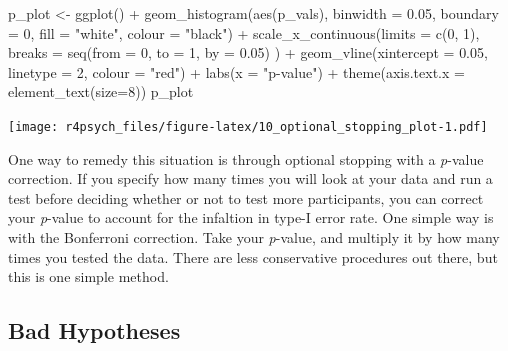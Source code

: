 \documentclass[
]{book}
\newenvironment{Shaded}{\begin{snugshade}}{\end{snugshade}}
\newcommand{\AttributeTok}[1]{\textcolor[rgb]{0.77,0.63,0.00}{#1}}
\newcommand{\DecValTok}[1]{\textcolor[rgb]{0.00,0.00,0.81}{#1}}
\newcommand{\FloatTok}[1]{\textcolor[rgb]{0.00,0.00,0.81}{#1}}
\newcommand{\FunctionTok}[1]{\textcolor[rgb]{0.00,0.00,0.00}{#1}}
\newcommand{\NormalTok}[1]{#1}
\newcommand{\OtherTok}[1]{\textcolor[rgb]{0.56,0.35,0.01}{#1}}
\newcommand{\SpecialCharTok}[1]{\textcolor[rgb]{0.00,0.00,0.00}{#1}}
\newcommand{\StringTok}[1]{\textcolor[rgb]{0.31,0.60,0.02}{#1}}
\begin{document}
\begin{Shaded}
\begin{Highlighting}[]
\NormalTok{p\_plot }\OtherTok{\textless{}{-}} \FunctionTok{ggplot}\NormalTok{() }\SpecialCharTok{+} 
  \FunctionTok{geom\_histogram}\NormalTok{(}\FunctionTok{aes}\NormalTok{(p\_vals),}
                 \AttributeTok{binwidth =} \FloatTok{0.05}\NormalTok{,}
                 \AttributeTok{boundary =} \DecValTok{0}\NormalTok{,}
                 \AttributeTok{fill =} \StringTok{"white"}\NormalTok{,}
                 \AttributeTok{colour =} \StringTok{"black"}\NormalTok{) }\SpecialCharTok{+}
  \FunctionTok{scale\_x\_continuous}\NormalTok{(}\AttributeTok{limits =} \FunctionTok{c}\NormalTok{(}\DecValTok{0}\NormalTok{, }\DecValTok{1}\NormalTok{), }
                     \AttributeTok{breaks =} \FunctionTok{seq}\NormalTok{(}\AttributeTok{from =} \DecValTok{0}\NormalTok{, }\AttributeTok{to =} \DecValTok{1}\NormalTok{, }\AttributeTok{by =} \FloatTok{0.05}\NormalTok{)}
\NormalTok{                     ) }\SpecialCharTok{+}
  \FunctionTok{geom\_vline}\NormalTok{(}\AttributeTok{xintercept =} \FloatTok{0.05}\NormalTok{, }\AttributeTok{linetype =} \DecValTok{2}\NormalTok{, }\AttributeTok{colour =} \StringTok{"red"}\NormalTok{) }\SpecialCharTok{+}
  \FunctionTok{labs}\NormalTok{(}\AttributeTok{x =} \StringTok{"p{-}value"}\NormalTok{) }\SpecialCharTok{+}
  \FunctionTok{theme}\NormalTok{(}\AttributeTok{axis.text.x =} \FunctionTok{element\_text}\NormalTok{(}\AttributeTok{size=}\DecValTok{8}\NormalTok{))}
\NormalTok{p\_plot}
\end{Highlighting}
\end{Shaded}

\texttt{[image: r4psych\_files/figure-latex/10\_optional\_stopping\_plot-1.pdf]}

One way to remedy this situation is through optional stopping with a \emph{p}-value correction. If you specify how many times you will look at your data and run a test before deciding whether or not to test more participants, you can correct your \emph{p}-value to account for the infaltion in type-I error rate. One simple way is with the Bonferroni correction. Take your \emph{p}-value, and multiply it by how many times you tested the data. There are less conservative procedures out there, but this is one simple method.

\hypertarget{bad-hypotheses}{%
\subsection{Bad Hypotheses}\label{bad-hypotheses}}
\end{document}
